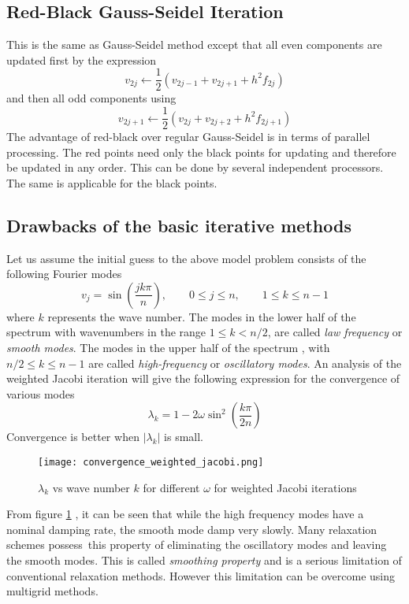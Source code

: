 \documentclass[a4paper]{report}
\begin{document}
	\subsection{Red-Black Gauss-Seidel Iteration}
	This is the same as Gauss-Seidel method except that all even components are updated first by the expression
	\begin{equation}
	v_{2j} \longleftarrow \frac{1}{2}\left( v_{2j-1} + v_{2j+1} + h^2 f_{2j} \right)
	\end{equation}
	and then all odd components using
	\begin{equation}
	v_{2j+1} \longleftarrow \frac{1}{2}\left( v_{2j} + v_{2j+2} + h^2 f_{2j+1} \right)
	\end{equation}
	The advantage of red-black over regular Gauss-Seidel is in terms of parallel processing.
	The red points need only the black points for updating and therefore be updated in any order. This can be done by several independent processors. The same is applicable for the black points.
	
	\subsection{Drawbacks of the basic iterative methods}
	Let us assume the initial guess to the above model problem consists of the following Fourier modes
	$$
	v_j = \sin \left( \frac{jk\pi}{n} \right), \qquad 0 \leq j \leq n,
	\qquad 1 \leq k \leq n-1
	$$
	where $k$ represents the wave number.
	The modes in the lower half of the spectrum  with wavenumbers in the range $1 \leq k < n/2 $, are called \textit{law frequency} or \textit{smooth modes}. The modes in the upper half of the spectrum , with $n/2 \leq k \leq n-1$ are called \textit{high-frequency} or \textit{oscillatory modes}.
	An analysis of the weighted Jacobi iteration will give the following expression for the convergence of various modes
	$$\lambda_k = 1-2\omega\sin^2 \left(\frac{k\pi}{2n}\right)$$
	Convergence is better when $|\lambda_k|$ is small.
	\begin{figure}[hbtp]
	\centering
	\texttt{[image: convergence\_weighted\_jacobi.png]}
	\caption{$\lambda_k$ vs wave number $k$ for different $\omega$ for weighted Jacobi iterations}\label{conv_wj}
	\end{figure}
	From figure \ref{conv_wj} \cite{multigrid}, it can be seen that while the high frequency modes have a nominal damping rate, the smooth mode damp very slowly. Many relaxation schemes possess\ this property of eliminating the oscillatory modes and leaving the smooth modes. This is called \textit{smoothing property} and is a serious limitation of conventional relaxation methods.
	However this limitation can be overcome using multigrid methods. 
	
\end{document}
